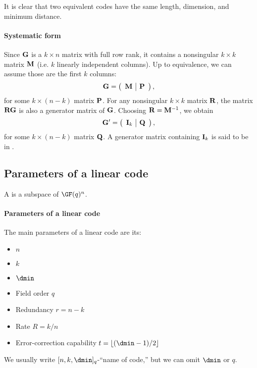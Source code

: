 \documentclass[a4paper, 11pt, openany]{book}
\begin{document}

It is clear that two equivalent codes have the same length, dimension, and minimum distance.





\paragraph{Systematic form}
Since ${\bf G}$ is a $k \times n$ matrix with full row rank, it contains a nonsingular $k \times k$ matrix ${\bf M}$ (i.e. $k$ linearly independent columns). Up to equivalence, we can assume those are the first $k$ columns:
\[
	{\bf G} = \left( \begin{array}{c|c}
				{\bf M} & {\bf P}
	\end{array} \right),
\]
for some $k \times (n-k)$ matrix ${\bf P}$. For any nonsingular $k \times k$ matrix ${\bf R}$, the matrix ${\bf R}{\bf G}$ is also a generator matrix of ${\bf G}$. Choosing ${\bf R} = {\bf M}^{-1}$, we obtain
\[
	{\bf G}' = \left( \begin{array}{c|c}
					{\bf I}_k & {\bf Q}
		\end{array} \right),
\]
for some $k \times (n-k)$ matrix ${\bf Q}$. A generator matrix containing ${\bf I}_k$ is said to be in .






\subsection{Parameters of a linear code}

A  is a subspace of $\GF(q)^n$.



\paragraph{Parameters of a linear code}
The main parameters of a linear code are its:
\begin{itemize}
	\item {} $n$
	\item {} $k$
	\item {} $\dmin$
	\item Field order $q$
	\item Redundancy $r = n-k$
	\item Rate $R = k/n$
	\item Error-correction capability $t = \lfloor (\dmin-1)/2 \rfloor$
\end{itemize}
We usually write $[n,k,\dmin]_q$-``name of code,'' but we can omit $\dmin$ or $q$.\\
~\\
\end{document}
